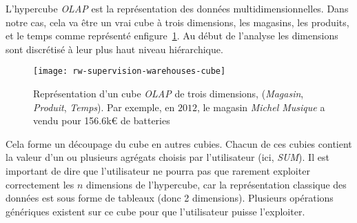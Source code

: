 L'hypercube \textit{OLAP} est la représentation des données multidimensionnelles. Dans notre cas, cela va être un vrai cube à trois dimensions, les magasins, les produits, et le temps comme représenté enfigure~\ref{fig:rw:supervision:warehouses:cube}. Au début de l'analyse les dimensions sont discrétisé à leur plus haut niveau hiérarchique.
\begin{figure}[ht]
	\centering
	\texttt{[image: rw-supervision-warehouses-cube]}
	\caption{Représentation d'un cube \textit{OLAP} de trois dimensions, (\textit{Magasin}, \textit{Produit}, \textit{Temps}). Par exemple, en $2012$, le magasin \textit{Michel Musique} a vendu pour 156.6k\euro{} de batteries}\label{fig:rw:supervision:warehouses:cube}
\end{figure}
Cela forme un découpage du cube en autres cubies. Chacun de ces cubies contient la valeur d'un ou plusieurs agrégats choisis par l'utilisateur (ici, \textit{SUM}). Il est important de dire que l'utilisateur ne pourra pas que rarement exploiter correctement les $n$ dimensions de l'hypercube, car la représentation classique des données est sous forme de tableaux (donc 2 dimensions). Plusieurs opérations génériques existent sur ce cube pour que l'utilisateur puisse l'exploiter.

